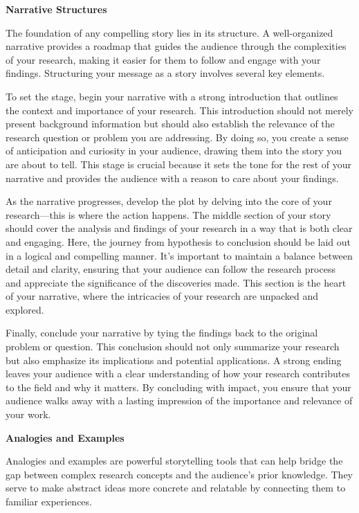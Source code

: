 \documentclass[
]{book}
\begin{document}
\textbf{Narrative Structures}

The foundation of any compelling story lies in its structure. A well-organized narrative provides a roadmap that guides the audience through the complexities of your research, making it easier for them to follow and engage with your findings. Structuring your message as a story involves several key elements.

To set the stage, begin your narrative with a strong introduction that outlines the context and importance of your research. This introduction should not merely present background information but should also establish the relevance of the research question or problem you are addressing. By doing so, you create a sense of anticipation and curiosity in your audience, drawing them into the story you are about to tell. This stage is crucial because it sets the tone for the rest of your narrative and provides the audience with a reason to care about your findings.

As the narrative progresses, develop the plot by delving into the core of your research---this is where the action happens. The middle section of your story should cover the analysis and findings of your research in a way that is both clear and engaging. Here, the journey from hypothesis to conclusion should be laid out in a logical and compelling manner. It's important to maintain a balance between detail and clarity, ensuring that your audience can follow the research process and appreciate the significance of the discoveries made. This section is the heart of your narrative, where the intricacies of your research are unpacked and explored.

Finally, conclude your narrative by tying the findings back to the original problem or question. This conclusion should not only summarize your research but also emphasize its implications and potential applications. A strong ending leaves your audience with a clear understanding of how your research contributes to the field and why it matters. By concluding with impact, you ensure that your audience walks away with a lasting impression of the importance and relevance of your work.

\textbf{Analogies and Examples}

Analogies and examples are powerful storytelling tools that can help bridge the gap between complex research concepts and the audience's prior knowledge. They serve to make abstract ideas more concrete and relatable by connecting them to familiar experiences.
\end{document}
